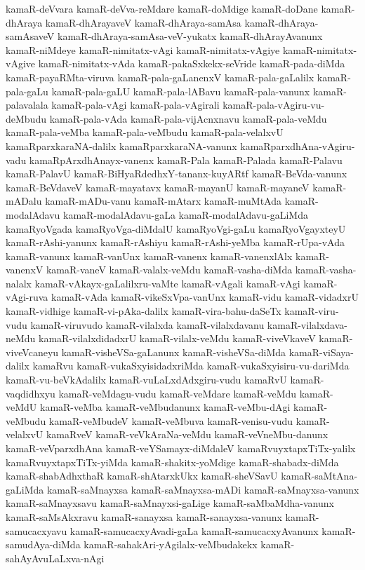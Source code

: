 {kamaR-deVvara
kamaR-deVva-reMdare
kamaR-doMdige
kamaR-doDane
kamaR-dhAraya
kamaR-dhArayaveV
kamaR-dhAraya-samAsa
kamaR-dhAraya-samAsaveV
kamaR-dhAraya-samAsa-veV-yukatx
kamaR-dhArayAvanunx
kamaR-niMdeye
kamaR-nimitatx-vAgi
kamaR-nimitatx-vAgiye
kamaR-nimitatx-vAgive
kamaR-nimitatx-vAda
kamaR-pakaSxkekx-seVride
kamaR-pada-diMda
kamaR-payaRMta-viruva
kamaR-pala-gaLanenxV
kamaR-pala-gaLalilx
kamaR-pala-gaLu
kamaR-pala-gaLU
kamaR-pala-lABavu
kamaR-pala-vanunx
kamaR-palavalala
kamaR-pala-vAgi
kamaR-pala-vAgirali
kamaR-pala-vAgiru-vu-deMbudu
kamaR-pala-vAda
kamaR-pala-vijAcnxnavu
kamaR-pala-veMdu
kamaR-pala-veMba
kamaR-pala-veMbudu
kamaR-pala-velalxvU
kamaRparxkaraNA-dalilx
kamaRparxkaraNA-vanunx
kamaRparxdhAna-vAgiru-vadu
kamaRpArxdhAnayx-vanenx
kamaR-Pala
kamaR-Palada
kamaR-Palavu
kamaR-PalavU
kamaR-BiHyaRdedhxY-tananx-kuyARtf
kamaR-BeVda-vanunx
kamaR-BeVdaveV
kamaR-mayatavx
kamaR-mayanU
kamaR-mayaneV
kamaR-mADalu
kamaR-mADu-vanu
kamaR-mAtarx
kamaR-muMtAda
kamaR-modalAdavu
kamaR-modalAdavu-gaLa
kamaR-modalAdavu-gaLiMda
kamaRyoVgada
kamaRyoVga-diMdalU
kamaRyoVgi-gaLu
kamaRyoVgayxteyU
kamaR-rAshi-yanunx
kamaR-rAshiyu
kamaR-rAshi-yeMba
kamaR-rUpa-vAda
kamaR-vanunx
kamaR-vanUnx
kamaR-vanenx
kamaR-vanenxlAlx
kamaR-vanenxV
kamaR-vaneV
kamaR-valalx-veMdu
kamaR-vasha-diMda
kamaR-vasha-nalalx
kamaR-vAkayx-gaLalilxru-vaMte
kamaR-vAgali
kamaR-vAgi
kamaR-vAgi-ruva
kamaR-vAda
kamaR-vikeSxVpa-vanUnx
kamaR-vidu
kamaR-vidadxrU
kamaR-vidhige
kamaR-vi-pAka-dalilx
kamaR-vira-bahu-daSeTx
kamaR-viru-vudu
kamaR-viruvudo
kamaR-vilalxda
kamaR-vilalxdavanu
kamaR-vilalxdava-neMdu
kamaR-vilalxdidadxrU
kamaR-vilalx-veMdu
kamaR-viveVkaveV
kamaR-viveVcaneyu
kamaR-visheVSa-gaLanunx
kamaR-visheVSa-diMda
kamaR-viSaya-dalilx
kamaRvu
kamaR-vukaSxyisidadxriMda
kamaR-vukaSxyisiru-vu-dariMda
kamaR-vu-beVkAdalilx
kamaR-vuLaLxdAdxgiru-vudu
kamaRvU
kamaR-vaqdidhxyu
kamaR-veMdagu-vudu
kamaR-veMdare
kamaR-veMdu
kamaR-veMdU
kamaR-veMba
kamaR-veMbudanunx
kamaR-veMbu-dAgi
kamaR-veMbudu
kamaR-veMbudeV
kamaR-veMbuva
kamaR-venisu-vudu
kamaR-velalxvU
kamaRveV
kamaR-veVkAraNa-veMdu
kamaR-veVneMbu-danunx
kamaR-veVparxdhAna
kamaR-veYSamayx-diMdaleV
kamaRvuyxtapxTiTx-yalilx
kamaRvuyxtapxTiTx-yiMda
kamaR-shakitx-yoMdige
kamaR-shabadx-diMda
kamaR-shabAdhxthaR
kamaR-shAtarxkUkx
kamaR-sheVSavU
kamaR-saMtAna-gaLiMda
kamaR-saMnayxsa
kamaR-saMnayxsa-mADi
kamaR-saMnayxsa-vanunx
kamaR-saMnayxsavu
kamaR-saMnayxsi-gaLige
kamaR-saMbaMdha-vanunx
kamaR-saMsAkxravu
kamaR-sanayxsa
kamaR-sanayxsa-vanunx
kamaR-samucacxyavu
kamaR-samucacxyAvadi-gaLa
kamaR-samucacxyAvanunx
kamaR-samudAya-diMda
kamaR-sahakAri-yAgilalx-veMbudakekx
kamaR-sahAyAvuLaLxva-nAgi
}
